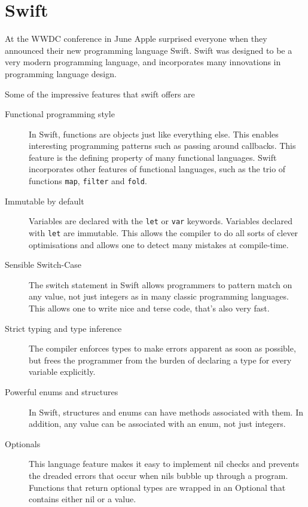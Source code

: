\documentclass[pdftex, DIV=calc, paper=a4, fontsize=11pt]{scrartcl}	 %
\begin{document}
\section{Swift}
\label{sec:swift}

At the WWDC\cite{wwdc} conference in June Apple surprised everyone when they announced their new programming
language Swift. Swift was designed to be a very modern programming language, and incorporates
many innovations in programming language design.

Some of the impressive features that swift offers are
\begin{description}
    \item[Functional programming style] In Swift, functions are objects just like everything else.
        This enables interesting programming patterns such as passing around callbacks. This feature
        is the defining property of many functional languages. Swift incorporates other features 
        of functional languages, such as the trio of functions \texttt{map}, \texttt{filter} and \texttt{fold}.
    \item[Immutable by default] Variables are declared with the \texttt{let} or \texttt{var}
        keywords. Variables declared with \texttt{let} are immutable. This allows the compiler to
        do all sorts of clever optimisations and allows one to detect many mistakes at compile-time.
    \item[Sensible Switch-Case] The switch statement in Swift allows programmers to pattern match on
        any value, not just integers as in many classic programming languages. This allows one 
        to write nice and terse code, that's also very fast.
    \item[Strict typing and type inference] The compiler enforces types to make errors apparent as
        soon as possible, but frees the programmer from the burden of declaring a type for every
        variable explicitly.
    \item[Powerful enums and structures] In Swift, structures and enums can have methods associated with them. In addition, any value can be associated with an enum, not just integers.
    \item[Optionals] This language feature makes it easy to implement nil checks and prevents the 
        dreaded errors that occur when nils bubble up through a program. Functions that return 
        optional types are wrapped in an Optional that contains either nil or a value. 
\end{description}
\end{document}
